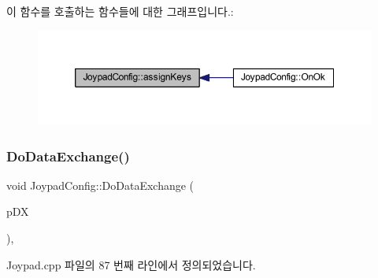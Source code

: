 이 함수를 호출하는 함수들에 대한 그래프입니다.\+:
\nopagebreak
\begin{figure}[H]
\begin{center}
\leavevmode
\includegraphics[width=350pt]{class_joypad_config_a37ced249f71ab247733787e07085e295_icgraph}
\end{center}
\end{figure}
\mbox{\label{class_joypad_config_a9b0e5a934f13fb9009211c082933eb50}} 
\subsubsection{\texorpdfstring{Do\+Data\+Exchange()}{DoDataExchange()}}
{\footnotesize\ttfamily void Joypad\+Config\+::\+Do\+Data\+Exchange (\begin{DoxyParamCaption}\item[{C\+Data\+Exchange $\ast$}]{p\+DX }\end{DoxyParamCaption})\hspace{0.3cm}{\ttfamily [protected]}, {\ttfamily [virtual]}}



Joypad.\+cpp 파일의 87 번째 라인에서 정의되었습니다.


